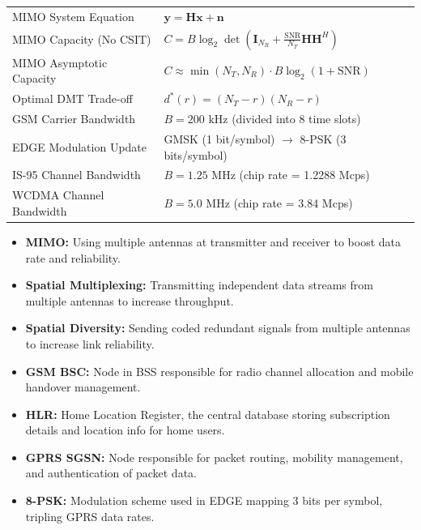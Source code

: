 \documentclass[12pt,a4paper]{article}
\renewcommand{\arraystretch}{1.45}
\begin{document}
\begin{tcolorbox}[formulabox, title={\textbf{Key Formulas at a Glance}}]
\renewcommand{\arraystretch}{1.3}
\begin{tabularx}{\linewidth}{B{5.5cm} X}MIMO System Equation & $\mathbf{y} = \mathbf{H} \mathbf{x} + \mathbf{n}$ \\
MIMO Capacity (No CSIT) & $C = B \log_2 \det \left( \mathbf{I}_{N_R} + \frac{\text{SNR}}{N_T} \mathbf{H} \mathbf{H}^H \right)$ \\
MIMO Asymptotic Capacity & $C \approx \min(N_T, N_R) \cdot B \log_2(1 + \text{SNR})$ \\
Optimal DMT Trade-off & $d^*(r) = (N_T - r)(N_R - r)$ \\
GSM Carrier Bandwidth & $B = 200 \text{ kHz}$ \quad (divided into 8 time slots) \\
EDGE Modulation Update & GMSK (1 bit/symbol) $\to$ 8-PSK (3 bits/symbol) \\
IS-95 Channel Bandwidth & $B = 1.25 \text{ MHz}$ \quad (chip rate = 1.2288 Mcps) \\
WCDMA Channel Bandwidth & $B = 5.0 \text{ MHz}$ \quad (chip rate = 3.84 Mcps)
\end{tabularx}
\end{tcolorbox}

\begin{tcolorbox}[defbox, title={\textbf{One-Line Definitions}}]
\begin{itemize}[leftmargin=*, itemsep=2.5pt, topsep=0pt]
  \item \textbf{MIMO:} Using multiple antennas at transmitter and receiver to boost data rate and reliability.
  \item \textbf{Spatial Multiplexing:} Transmitting independent data streams from multiple antennas to increase throughput.
  \item \textbf{Spatial Diversity:} Sending coded redundant signals from multiple antennas to increase link reliability.
  \item \textbf{GSM BSC:} Node in BSS responsible for radio channel allocation and mobile handover management.
  \item \textbf{HLR:} Home Location Register, the central database storing subscription details and location info for home users.
  \item \textbf{GPRS SGSN:} Node responsible for packet routing, mobility management, and authentication of packet data.
  \item \textbf{8-PSK:} Modulation scheme used in EDGE mapping 3 bits per symbol, tripling GPRS data rates.
\end{itemize}
\end{tcolorbox}
\end{document}
